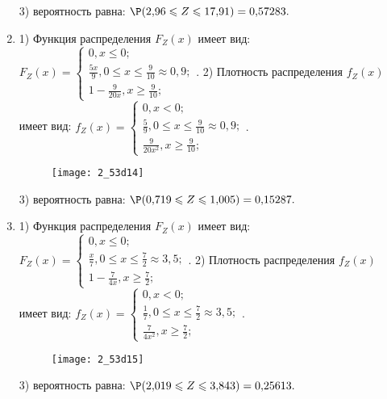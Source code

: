 \documentclass[a4paper,12pt]{article}
\begin{document}
\begin{enumerate}
3) вероятность равна:
$
\P(2,\!96\leqslant Z\leqslant 17,\!91)=
0,\!57283.
$



\item


1) Функция распределения $F_Z(x)$ имеет вид:
$
F_Z(x)=\left\{
\begin{array}{l}
0, x\leqslant 0;\\
\frac{5 x}{9}, 0\leqslant x\leqslant \frac{9}{10}\approx 0,\!9;\\
1 - \frac{9}{20 x}, x\geqslant\frac{9}{10};
\end{array}.
\right.
$
2) Плотность распределения $f_Z(x)$ имеет вид:
$
f_Z(x)=\left\{
\begin{array}{l}
0, x<0;\\
\frac{5}{9}, 0\leqslant x\leqslant \frac{9}{10}\approx 0,\!9;\\
\frac{9}{20 x^{2}}, x\geqslant\frac{9}{10};
\end{array}.
\right.
$


\begin{figure}[H]
    \texttt{[image: 2\_53d14]}
\end{figure}


3) вероятность равна:
$
\P(0,\!719\leqslant Z\leqslant 1,\!005)=
0,\!15287.
$



\item


1) Функция распределения $F_Z(x)$ имеет вид:
$
F_Z(x)=\left\{
\begin{array}{l}
0, x\leqslant 0;\\
\frac{x}{7}, 0\leqslant x\leqslant \frac{7}{2}\approx 3,\!5;\\
1 - \frac{7}{4 x}, x\geqslant\frac{7}{2};
\end{array}.
\right.
$
2) Плотность распределения $f_Z(x)$ имеет вид:
$
f_Z(x)=\left\{
\begin{array}{l}
0, x<0;\\
\frac{1}{7}, 0\leqslant x\leqslant \frac{7}{2}\approx 3,\!5;\\
\frac{7}{4 x^{2}}, x\geqslant\frac{7}{2};
\end{array}.
\right.
$


\begin{figure}[H]
    \texttt{[image: 2\_53d15]}
\end{figure}


3) вероятность равна:
$
\P(2,\!019\leqslant Z\leqslant 3,\!843)=
0,\!25613.
$




\end{enumerate}
\end{document}
